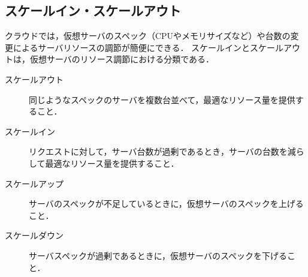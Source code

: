 \subsection{スケールイン・スケールアウト}
クラウドでは，仮想サーバのスペック（CPUやメモリサイズなど）や台数の変更によるサーバリソースの調節が簡便にできる．
スケールインとスケールアウトは，仮想サーバのリソース調節における分類である．
\begin{description}
    \item[スケールアウト] 同じようなスペックのサーバを複数台並べて，最適なリソース量を提供すること．
    \item[スケールイン] リクエストに対して，{{サーバ}}台数が過剰であるとき，{{サーバ}}の台数を減らして最適なリソース量を提供すること．
    \item[スケールアップ] {{サーバ}}のスペックが不足しているときに，仮想{{サーバ}}のスペックを上げること．
    \item[スケールダウン] {{サーバ}}スペックが過剰であるときに，仮想{{サーバ}}のスペックを下げること．
\end{description}
\begin{flushright}
    \hfill\cite{スケールアップ}
\end{flushright}
